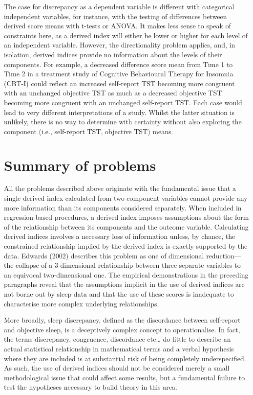 \documentclass[
]{article}
\begin{document}
The case for discrepancy as a dependent variable is different with categorical independent variables, for instance, with the testing of differences between derived score means with t-tests or ANOVA. It makes less sense to speak of constraints here, as a derived index will either be lower or higher for each level of an independent variable. However, the directionality problem applies, and, in isolation, derived indices provide no information about the levels of their components. For example, a decreased difference score mean from Time 1 to Time 2 in a treatment study of Cognitive Behavioural Therapy for Insomnia (CBT-I) could reflect an increased self-report TST becoming more congruent with an unchanged objective TST as much as a decreased objective TST becoming more congruent with an unchanged self-report TST. Each case would lead to very different interpretations of a study. Whilst the latter situation is unlikely, there is no way to determine with certainty without also exploring the component (i.e., self-report TST, objective TST) means.

\section{Summary of problems}\label{summary-of-problems}

All the problems described above originate with the fundamental issue that a single derived index calculated from two component variables cannot provide any more information than its components considered separately. When included in regression-based procedures, a derived index imposes assumptions about the form of the relationship between its components and the outcome variable. Calculating derived indices involves a necessary loss of information unless, by chance, the constrained relationship implied by the derived index is exactly supported by the data. Edwards (2002) describes this problem as one of dimensional reduction---the collapse of a 3-dimensional relationship between three separate variables to an equivocal two-dimensional one. The empirical demonstrations in the preceding paragraphs reveal that the assumptions implicit in the use of derived indices are not borne out by sleep data and that the use of these scores is inadequate to characterise more complex underlying relationships.

More broadly, sleep discrepancy, defined as the discordance between self-report and objective sleep, is a deceptively complex concept to operationalise. In fact, the terms discrepancy, congruence, discordance etc\ldots{} do little to describe an actual statistical relationship in mathematical terms and a verbal hypothesis where they are included is at substantial risk of being completely underspecified. As such, the use of derived indices should not be considered merely a small methodological issue that could affect some results, but a fundamental failure to test the hypotheses necessary to build theory in this area.
\end{document}
